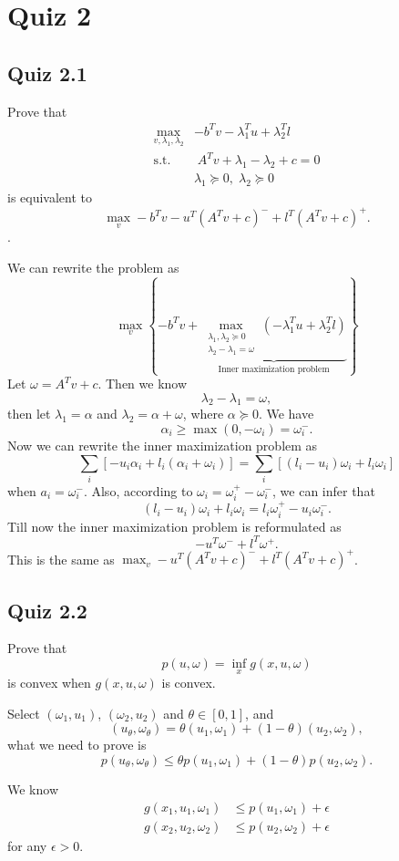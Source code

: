 \documentclass[lang=en,color=blue,mode=fancy,titlestyle=hang]{elegantbook}
\begin{document}
\section{Quiz 2}
\subsection{Quiz 2.1}
Prove that
\begin{align*}
\max_{v, \lambda_1, \lambda_2}& -b^T v - \lambda_1^T u + \lambda_2^T l\\
\text{s.t.}& \; A^T v + \lambda_1 - \lambda_2 + c = 0\\
&\lambda_1 \succeq 0, \; \lambda_2 \succeq 0
\end{align*}
is equivalent to
\[
\max_{v} -b^T v - u^T (A^T v + c)^- + l^T (A^T v + c)^+.
\].

We can rewrite the problem as
\[
\max_{v} \left\{ 
    -b^T v +
    \underbrace{
        \max_{\substack{\lambda_1, \lambda_2 \succeq 0 \\ \lambda_2 - \lambda_1 = \omega}} \left( -\lambda_1^T u + \lambda_2^T l \right)
    }_{\text{Inner maximization problem}}
\right\}
\]
Let $\omega = A^T v + c$. Then we know
\[
\lambda_2 - \lambda_1 = \omega,
\]
then let $\lambda_1 = \alpha$ and $\lambda_2 = \alpha + \omega$, where $\alpha \succeq 0$. We have
\[
\alpha_i \geq \max(0, -\omega_i) = \omega_i^-.
\]
Now we can rewrite the inner maximization problem as
\[
\sum_i [-u_i \alpha_i + l_i (\alpha_i + \omega_i)] = \sum_i [(l_i - u_i) \omega_i + l_i \omega_i]
\]
when $a_i = \omega_i^-$. Also, according to $\omega_i = \omega_i^+ - \omega_i^-$, we can infer that
\[
(l_i - u_i) \omega_i + l_i \omega_i = l_i \omega_i^+ - u_i \omega_i^-.
\]
Till now the inner maximization problem is reformulated as
\[
-u^T \omega^- + l^T \omega^+.
\]
This is the same as $\max_v -u^T (A^T v + c)^- + l^T (A^T v + c)^+$.

\subsection{Quiz 2.2}
Prove that
\[
p(u, \omega)  = \inf_x g(x, u, \omega)
\]
is convex when $g(x, u, \omega)$ is convex.

Select $(\omega_1, u_1)$, $(\omega_2, u_2)$ and $\theta \in [0, 1]$, and
\[
(u_{\theta}, \omega_{\theta}) = \theta (u_1, \omega_1) + (1 - \theta) (u_2, \omega_2),
\]
what we need to prove is
\[
p(u_{\theta}, \omega_{\theta}) \leq \theta p(u_1, \omega_1) + (1 - \theta) p(u_2, \omega_2).
\]

We know
\begin{align*}
g(x_1, u_1, \omega_1) &\leq p(u_1, \omega_1) + \epsilon\\
g(x_2, u_2, \omega_2) &\leq p(u_2, \omega_2) + \epsilon
\end{align*}
for any $\epsilon > 0$.
\end{document}
